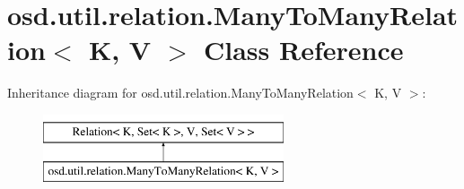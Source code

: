\hypertarget{classosd_1_1util_1_1relation_1_1_many_to_many_relation_3_01_k_00_01_v_01_4}{\section{osd.\-util.\-relation.\-Many\-To\-Many\-Relation$<$ K, V $>$ Class Reference}
\label{classosd_1_1util_1_1relation_1_1_many_to_many_relation_3_01_k_00_01_v_01_4}
}
Inheritance diagram for osd.\-util.\-relation.\-Many\-To\-Many\-Relation$<$ K, V $>$\-:\begin{figure}[H]
\begin{center}
\leavevmode
\includegraphics[height=2.000000cm]{classosd_1_1util_1_1relation_1_1_many_to_many_relation_3_01_k_00_01_v_01_4}
\end{center}
\end{figure}
